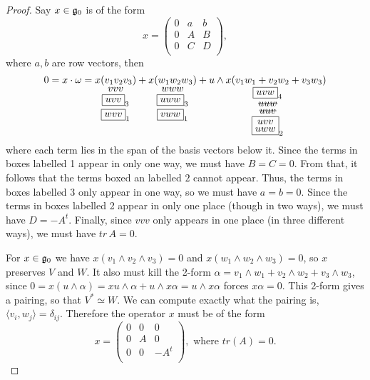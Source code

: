 \begin{proof}
   Say $x\in \mathfrak{g}_0$ is of the form
   \[
    x = \left(\begin{array}{c|cc}
      0 & a & b\\ \hline
      0 & A & B\\
      0 & C & D\\
    \end{array}\right),
   \]
   where $a,b$ are row vectors, then
   \[
     0 = x\cdot \w =
       \underset{\shortstack{$vvv$\\
                      $\fbox{$uvv$}_3$\\
                      $\fbox{$wvv$}_1$}}{x(v_1v_2v_3)}
     + \underset{\shortstack{$www$\\
                      $\fbox{$uww$}_3$\\
                      $\fbox{$vww$}_1$}}{x(w_1w_2w_3)}
     + \underset{\shortstack{$\fbox{$uvw$}_4$\\
        \rlap{\rule[2.5pt]{4.5ex}{.4pt}}$uuw$ \\
        \rlap{\rule[2.5pt]{4ex}{.4pt}}$uuv$ \\
                 $\fbox{\shortstack{$uvv$ \\
                                    $uww$}}_{2}$}}{u\wedge x(v_1w_1+ v_2w_2+v_3w_3)}
   \]
   where each term lies in the span of the basis vectors below it. Since the terms in
   boxes labelled 1 appear in only one way, we must have $B=C=0$. From that, it
   follows that the terms boxed an labelled $2$ cannot appear. Thus, the terms in
   boxes labelled 3 only appear in one way, so we must have $a=b=0$. Since the terms
   in boxes labelled 2 appear in only one place (though in two ways), we must have
   $D=-A^t$. Finally, since $vvv$ only appears in one place (in three different ways),
   we must have $tr\, A=0$.


   For $x\in \mathfrak{g}_0$ we have $x(v_1\wedge v_2\wedge v_3)=0$ and
   $x(w_1\wedge w_2\wedge w_3)=0$, so $x$ preserves $V$ and $W$. It also must kill the
   2-form $\alpha = v_1\wedge w_1+ v_2\wedge w_2+ v_3\wedge w_3$, since
   $0=x(u\wedge\alpha)=xu\wedge\alpha+u\wedge x\alpha=u\wedge x\alpha$ forces $x\alpha
   =0$. This 2-form gives a pairing, so that $V^* \simeq W$. We can compute exactly
   what the pairing is, $\langle v_i,w_j\rangle =\delta_{ij}$. Therefore the operator
   $x$ must be of the form
   \[
    x = \left(\begin{array}{c|cc}
      0 & 0 & 0\\ \hline
      0 & A & 0\\
      0 & 0 & -A^t\\
    \end{array}\right), \text{ where }tr(A)=0.
   \]


\end{proof}

